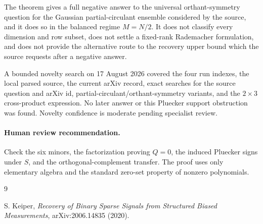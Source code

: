 \documentclass[11pt]{article}
\begin{document}
The theorem gives a full negative answer to the universal orthant-symmetry
question for the Gaussian partial-circulant ensemble considered by the source,
and it does so in the balanced regime $M=N/2$.  It does not classify every
dimension and row subset, does not settle a fixed-rank Rademacher formulation,
and does not provide the alternative route to the recovery upper bound which
the source requests after a negative answer.

A bounded novelty search on 17 August 2026 covered the four run indexes, the
local parsed source, the current arXiv record, exact searches for the source
question and arXiv id, partial-circulant/orthant-symmetry variants, and the
$2\times3$ cross-product expression.  No later answer or this Pluecker support
obstruction was found.  Novelty confidence is moderate pending specialist
review.

\paragraph{Human review recommendation.}
Check the six minors, the factorization proving $Q=0$, the induced Pluecker
signs under $S$, and the orthogonal-complement transfer.  The proof uses only
elementary algebra and the standard zero-set property of nonzero polynomials.

\begin{thebibliography}{9}
\raggedright
{}
S. Keiper,
\emph{Recovery of Binary Sparse Signals from Structured Biased Measurements},
arXiv:2006.14835 (2020).
\end{thebibliography}
\end{document}
